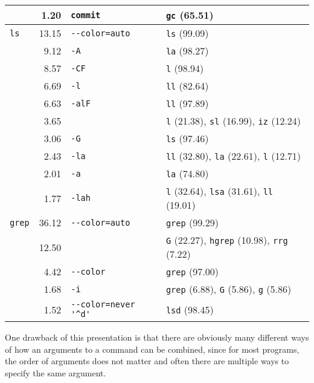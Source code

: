 \begin{table*}
\begin{tabular}{lrll}
                     &   \num{1.20} &             \verb|commit| &                                                                 \verb|gc| (\num{65.51}) \\
        \midrule
           \verb|ls| &  \num{13.15} &       \verb|--color=auto| &                                                                 \verb|ls| (\num{99.09}) \\
                     &   \num{9.12} &                 \verb|-A| &                                                                 \verb|la| (\num{98.27}) \\
                     &   \num{8.57} &                \verb|-CF| &                                                                  \verb|l| (\num{98.94}) \\
                     &   \num{6.69} &                 \verb|-l| &                                                                 \verb|ll| (\num{82.64}) \\
                     &   \num{6.63} &               \verb|-alF| &                                                                 \verb|ll| (\num{97.89}) \\
                     &   \num{3.65} &                   \verb|| &      \verb|l| (\num{21.38}), \verb|sl| (\num{16.99}), \verb|iz| (\num{12.24}) \\
                     &   \num{3.06} &                 \verb|-G| &                                                                 \verb|ls| (\num{97.46}) \\
                     &   \num{2.43} &                \verb|-la| &      \verb|ll| (\num{32.80}), \verb|la| (\num{22.61}), \verb|l| (\num{12.71}) \\
                     &   \num{2.01} &                 \verb|-a| &                                                                 \verb|la| (\num{74.80}) \\
                     &   \num{1.77} &               \verb|-lah| &     \verb|l| (\num{32.64}), \verb|lsa| (\num{31.61}), \verb|ll| (\num{19.01}) \\
        \midrule
         \verb|grep| &  \num{36.12} &       \verb|--color=auto| &                                                               \verb|grep| (\num{99.29}) \\
                     &  \num{12.50} &                   \verb|| &   \verb|G| (\num{22.27}), \verb|hgrep| (\num{10.98}), \verb|rrg| (\num{7.22}) \\
                     &   \num{4.42} &            \verb|--color| &                                                               \verb|grep| (\num{97.00}) \\
                     &   \num{1.68} &                 \verb|-i| &        \verb|grep| (\num{6.88}), \verb|G| (\num{5.86}), \verb|g| (\num{5.86}) \\
                     &   \num{1.52} & \verb|--color=never '^d'| &                                                                \verb|lsd| (\num{98.45}) \\
        \bottomrule
    \end{tabular}
\end{table*}

One drawback of this presentation is that there are obviously many different ways of how an arguments to a command can be combined, since for most programs, the order of arguments does not matter and often there are multiple ways to specify the same argument.
\TODO
